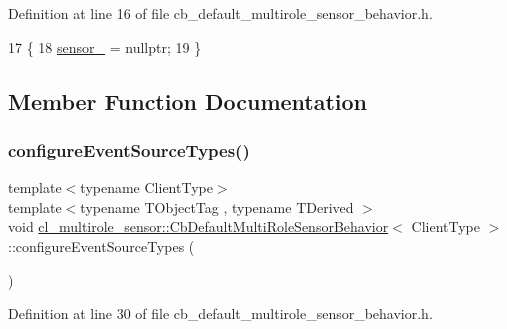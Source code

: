 Definition at line 16 of file cb\+\_\+default\+\_\+multirole\+\_\+sensor\+\_\+behavior.\+h.


\begin{DoxyCode}
17   \{
18     \hyperlink{classcl__multirole__sensor_1_1CbDefaultMultiRoleSensorBehavior_a201893c3c859259eac3166405f3509cb}{sensor\_} = \textcolor{keyword}{nullptr};
19   \}
\end{DoxyCode}


\subsection{Member Function Documentation}
\mbox{\label{classcl__multirole__sensor_1_1CbDefaultMultiRoleSensorBehavior_a658842c0c467a0592f1f1aab32d5c2c4}} 
\subsubsection{\texorpdfstring{configure\+Event\+Source\+Types()}{configureEventSourceTypes()}}
{\footnotesize\ttfamily template$<$typename Client\+Type$>$ \\
template$<$typename T\+Object\+Tag , typename T\+Derived $>$ \\
void \hyperlink{classcl__multirole__sensor_1_1CbDefaultMultiRoleSensorBehavior}{cl\+\_\+multirole\+\_\+sensor\+::\+Cb\+Default\+Multi\+Role\+Sensor\+Behavior}$<$ Client\+Type $>$\+::configure\+Event\+Source\+Types (\begin{DoxyParamCaption}{ }\end{DoxyParamCaption})\hspace{0.3cm}{\ttfamily [inline]}}



Definition at line 30 of file cb\+\_\+default\+\_\+multirole\+\_\+sensor\+\_\+behavior.\+h.


